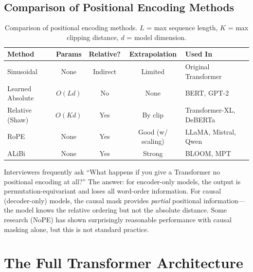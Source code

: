 \subsection{Comparison of Positional Encoding Methods}

\begin{table}[H]
\centering
\small
\begin{tabularx}{\textwidth}{@{}l c c c X@{}}
\toprule
\textbf{Method} & \textbf{Params} & \textbf{Relative?} & \textbf{Extrapolation} & \textbf{Used In} \\
\midrule
Sinusoidal         & None    & Indirect & Limited  & Original Transformer \\
Learned Absolute   & $O(Ld)$ & No       & None     & BERT, GPT-2 \\
Relative (Shaw)    & $O(Kd)$ & Yes      & By clip  & Transformer-XL, DeBERTa \\
RoPE               & None    & Yes      & Good (w/ scaling) & LLaMA, Mistral, Qwen \\
ALiBi              & None    & Yes      & Strong   & BLOOM, MPT \\
\bottomrule
\end{tabularx}
\caption{Comparison of positional encoding methods.  $L$ = max sequence length,
$K$ = max clipping distance, $d$ = model dimension.}
\label{tab:pos-encoding}
\end{table}

\begin{warningbox}
Interviewers frequently ask ``What happens if you give a Transformer no
positional encoding at all?''  The answer: for encoder-only models, the output
is permutation-equivariant and loses all word-order information.  For
causal (decoder-only) models, the causal mask provides \emph{partial}
positional information---the model knows the relative ordering but not the
absolute distance.  Some research (NoPE) has shown surprisingly reasonable
performance with causal masking alone, but this is not standard practice.
\end{warningbox}


\section{The Full Transformer Architecture}
\label{sec:full-arch}

